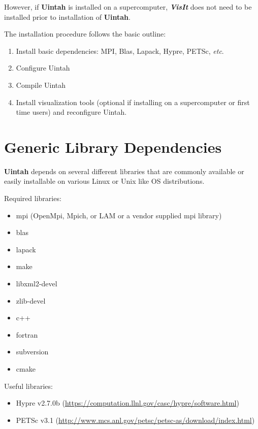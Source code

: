 \documentclass[12pt]{article}
\begin{document}
However, if \textbf{Uintah} is installed on a supercomputer,
\textbf{\emph{VisIt}} does not need to be installed prior to
installation of \textbf{Uintah}.

The installation procedure follows the basic outline:

\begin{enumerate}

\item Install basic dependencies: MPI, Blas, Lapack, Hypre, PETSc, \emph{etc}.

\item Configure Uintah

\item Compile Uintah

\item Install visualization tools (optional if installing on a
  supercomputer or first time users) and reconfigure Uintah.


\end{enumerate}



\section{Generic Library Dependencies}

\textbf{Uintah} depends on several different libraries that are
commonly available or easily installable on various Linux or Unix like
OS distributions.

Required libraries:
\begin{itemize}
\item mpi (OpenMpi, Mpich, or LAM or a vendor supplied mpi library)
\item blas
\item lapack
\item make
\item libxml2-devel
\item zlib-devel
\item c++
\item fortran
\item subversion
\item cmake

\end{itemize}

Useful libraries:
\begin{itemize}
\item Hypre v2.7.0b (\url{https://computation.llnl.gov/casc/hypre/software.html})
\item PETSc v3.1 (\url{http://www.mcs.anl.gov/petsc/petsc-as/download/index.html})
\end{itemize}
\end{document}

